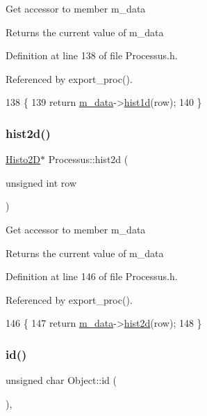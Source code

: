 Get accessor to member m\+\_\+data \begin{DoxyReturn}{Returns}
the current value of m\+\_\+data 
\end{DoxyReturn}


Definition at line 138 of file Processus.\+h.



Referenced by export\+\_\+proc().


\begin{DoxyCode}
138                                    \{
139     \textcolor{keywordflow}{return} \hyperlink{classProcessus_a3da9a9de8af54e2f47807a3e09dfccff}{m\_data}->\hyperlink{classData_a476a66728ccfc553909d15b36c22492a}{hist1d}(row);
140   \}
\end{DoxyCode}
\mbox{\label{classProcessus_a73b5118cb5f2b5eaad33286183b86cfc}} 
\subsubsection{\texorpdfstring{hist2d()}{hist2d()}}
{\footnotesize\ttfamily \hyperlink{classHisto2D}{Histo2D}$\ast$ Processus\+::hist2d (\begin{DoxyParamCaption}\item[{unsigned int}]{row }\end{DoxyParamCaption})\hspace{0.3cm}{\ttfamily [inline]}}

Get accessor to member m\+\_\+data \begin{DoxyReturn}{Returns}
the current value of m\+\_\+data 
\end{DoxyReturn}


Definition at line 146 of file Processus.\+h.



Referenced by export\+\_\+proc().


\begin{DoxyCode}
146                                    \{
147     \textcolor{keywordflow}{return} \hyperlink{classProcessus_a3da9a9de8af54e2f47807a3e09dfccff}{m\_data}->\hyperlink{classData_ab717ebe242192605ad509b76df35e855}{hist2d}(row);
148   \}
\end{DoxyCode}
\mbox{\label{classObject_af99145335cc61ff6e2798ea17db009d2}} 
\subsubsection{\texorpdfstring{id()}{id()}}
{\footnotesize\ttfamily unsigned char Object\+::id (\begin{DoxyParamCaption}{ }\end{DoxyParamCaption})\hspace{0.3cm}{\ttfamily [inline]}, {\ttfamily [inherited]}}




